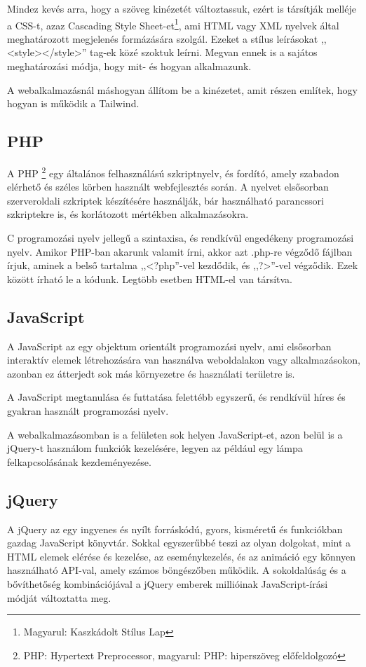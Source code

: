 \documentclass[
]{thesis-ekf}
\theoremstyle{definition}
\theoremstyle{remark}
\begin{document}
	Mindez kevés arra, hogy a szöveg kinézetét változtassuk, ezért is társítják melléje a CSS-t, azaz Cascading Style Sheet-et\footnote{Magyarul: Kaszkádolt Stílus Lap}, ami HTML vagy XML nyelvek által meghatározott megjelenés formázására szolgál. Ezeket a stílus leírásokat ,,<style></style>'' tag-ek közé szoktuk leírni. Megvan ennek is a sajátos meghatározási módja, hogy mit- és hogyan alkalmazunk.
	
	A webalkalmazásnál máshogyan állítom be a kinézetet, amit  részen említek, hogy hogyan is működik a Tailwind.
	
	\subsection{PHP}
	A PHP \footnote{PHP: Hypertext Preprocessor, magyarul: PHP: hiperszöveg előfeldolgozó} egy általános felhasználású szkriptnyelv, és fordító, amely szabadon elérhető és széles körben használt webfejlesztés során. A nyelvet elsősorban szerveroldali szkriptek készítésére használják, bár használható parancssori szkriptekre is, és korlátozott mértékben alkalmazásokra.\cite{php}
	
	C programozási nyelv jellegű a szintaxisa, és rendkívül engedékeny programozási nyelv. Amikor PHP-ban akarunk valamit írni, akkor azt .php-re végződő fájlban írjuk, aminek a belső tartalma ,,<?php''-vel kezdődik, és ,,?>''-vel végződik. Ezek között írható le a kódunk. Legtöbb esetben HTML-el van társítva.
	
	\subsection{JavaScript}
	A JavaScript az egy objektum orientált programozási nyelv, ami elsősorban interaktív elemek létrehozására van használva weboldalakon vagy alkalmazásokon, azonban ez átterjedt sok más környezetre és használati területre is.
	
	A JavaScript megtanulása és futtatása felettébb egyszerű, és rendkívül híres és gyakran használt programozási nyelv.\cite{javascript}
	
	A webalkalmazásomban is a felületen sok helyen JavaScript-et, azon belül is a jQuery-t használom funkciók kezelésére, legyen az például egy lámpa felkapcsolásának kezdeményezése.
	
	\subsection{jQuery}
	A jQuery az egy ingyenes és nyílt forráskódú, gyors, kisméretű és funkciókban gazdag JavaScript könyvtár. Sokkal egyszerűbbé teszi az olyan dolgokat, mint a HTML elemek elérése és kezelése, az eseménykezelés, és az animáció egy könnyen használható API-val, amely számos böngészőben működik. A sokoldalúság és a bővíthetőség kombinációjával a jQuery emberek millióinak JavaScript-írási módját változtatta meg. \cite{jquery}
	
\end{document}

